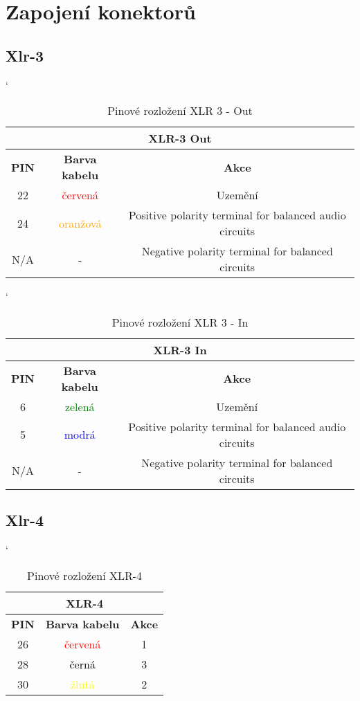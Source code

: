
\section{Zapojení konektorů}
\subsection{Xlr-3}

\begin{table} [H]
	\centering
	\catcode`
	\begin{tabular}[c]{|| c | c |  c ||}
	\hline
		\multicolumn{3}{||c||}{XLR-3 Out} \\
	\hline
 		 \textbf{PIN} & \textbf{Barva kabelu} & \textbf{Akce}\\
	\hline
		22 & \textcolor{red}{červená} & Uzemění\\
	\hline
		24 & \textcolor{orange}{oranžová} & Positive polarity terminal for balanced audio circuits \\
	\hline
		N/A & - &Negative polarity terminal for balanced circuits \\
	\hline
	\end{tabular}
	\caption{Pinové rozložení XLR 3 - Out}
	\label{table:pinXLR-OUT}
\end{table}

\begin{table} [h!]
	\centering
	\catcode` %
	\begin{tabular}[c]{|| c | c |  c ||}
	\hline
		\multicolumn{3}{||c||}{XLR-3 In} \\
	\hline
 		 \textbf{PIN} & \textbf{Barva kabelu} & \textbf{Akce}\\
	\hline
		6 & \textcolor{green}{zelená} & Uzemění\\
	\hline
		5 &  \textcolor{blue}{modrá} & Positive polarity terminal for balanced audio circuits \\
	\hline
		N/A & -  & Negative polarity terminal for balanced circuits \\
	\hline
	\end{tabular}
	\caption{Pinové rozložení XLR 3 - In}
	\label{table:pinXLR-IN}
\end{table}

\subsection{Xlr-4}

\begin{table} [h!]
	\centering
	\catcode`
	\begin{tabular}[c]{|| c | c | c ||}
	\hline
		\multicolumn{3}{||c||}{XLR-4} \\
	\hline
 		 \textbf{PIN} & \textbf{Barva kabelu} & \textbf{Akce}\\
	\hline
		26 & \textcolor{red}{červená} & 1\\
	\hline
		28 & \textcolor{black}{černá} & 3 \\
	\hline
		30 & \textcolor{yellow}{žlutá} & 2 \\
	\hline
	\end{tabular}
	\caption{Pinové rozložení XLR-4}
	\label{table:pinXLR-4}
\end{table}

